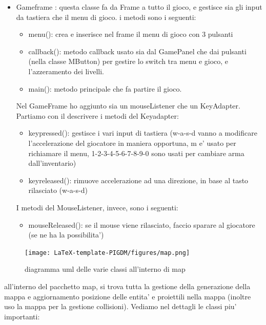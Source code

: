 \documentclass[12pt,a4paper]{report}
\begin{document}
\begin{itemize}
\item Gameframe : questa classe fa da Frame a tutto il gioco, e gestisce sia gli input da tastiera che il menu di gioco.
i metodi sono i seguenti:
\begin{itemize}
\item menu(): crea e inserisce nel frame il menu di gioco con 3 pulsanti
\item callback(): metodo callback usato sia dal GamePanel che dai pulsanti (nella classe MButton) per gestire lo switch tra menu e gioco, e l'azzeramento dei livelli.
\item main(): metodo principale che fa partire il gioco.
\end{itemize}
Nel GameFrame ho aggiunto sia un mouseListener che un KeyAdapter. Partiamo con il descrivere i metodi del Keyadapter:
\begin{itemize}
\item keypressed(): gestisce i vari input di tastiera (w-a-s-d vanno a modificare l'accelerazione del giocatore in maniera opportuna, m e' usato per richiamare il menu, 1-2-3-4-5-6-7-8-9-0 sono usati per cambiare arma dall'inventario)
\item keyreleased(): rimuove accelerazione ad una direzione, in base al tasto rilasciato (w-a-s-d)
\end{itemize}
I metodi del MouseListener, invece, sono i seguenti:
\begin{itemize}
\item mouseReleased(): se il mouse viene rilasciato, faccio sparare al giocatore (se ne ha la possibilita')
\end{itemize}
\end{itemize}
\newpage

\begin{figure}[h]
    \centering
    \texttt{[image: LaTeX-template-PIGDM/figures/map.png]}
    \caption{diagramma uml delle varie classi all'interno di map}
    \label{fig:enter-label}
\end{figure}
all'interno del pacchetto map, si trova tutta la gestione della generazione della mappa e aggiornamento posizione delle entita' e proiettili nella mappa (inoltre uso la mappa per la gestione collisioni).
Vediamo nel dettagli le classi piu' importanti:
\end{document}
